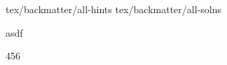 \documentclass{book}
\makeatletter
\newcommand{\Closesolutionfile}{}
\newcommand{\printbibliography}{}
\theoremstyle{definition}
\theoremstyle{definition}
\numberwithin{asy}{chapter}
\newcommand{\qw}[1][-1]{\ar @{-} [0,#1]}
\newcommand{\multigate}[2]{*+<1em,.9em>{\hphantom{#2}} \POS [0,0]="i",[0,0].[#1,0]="e",!C *{#2},"e"+UR;"e"+UL **\dir{-};"e"+DL **\dir{-};"e"+DR **\dir{-};"e"+UR **\dir{-},"i" \qw}
\newcommand{\ghost}[1]{*+<1em,.9em>{\hphantom{#1}} \qw}
\newcommand{\rstick}[1]{*!L!<-.5em,0em>=<0em>{#1}}
\newcommand{\lstick}[1]{*!R!<.5em,0em>=<0em>{#1}}
\newcommand{\Qcircuit}{\xymatrix @*=<0em>}
\makeatother
\begin{document}
\Closesolutionfile{tex/backmatter/all-hints}
\Closesolutionfile{tex/backmatter/all-solns}






\backmatter

\clearpage
\printbibliography[type=image,title={Image Attributions}]
\printbibliography[nottype=image]


asdf




456
\end{document}
